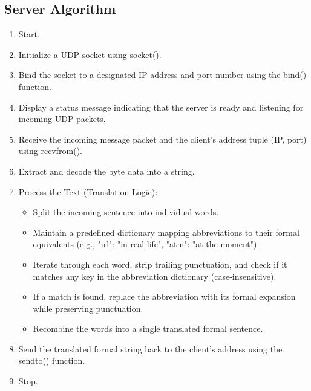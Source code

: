 \documentclass[12pt, a4paper]{report}
\begin{document}
\subsection*{Server Algorithm}
\begin{enumerate}
	\item Start.
	\item Initialize a UDP socket using socket().
	\item Bind the socket to a designated IP address and port number using the bind() function.
	\item Display a status message indicating that the server is ready and listening for incoming UDP packets.
	\item Receive the incoming message packet and the client's address tuple (IP, port) using recvfrom().
	\item Extract and decode the byte data into a string.
	\item Process the Text (Translation Logic):
	\begin{itemize}
		\item Split the incoming sentence into individual words.
		\item Maintain a predefined dictionary mapping abbreviations to their formal equivalents (e.g., "irl": "in real life", "atm": "at the moment").
		\item Iterate through each word, strip trailing punctuation, and check if it matches any key in the abbreviation dictionary (case-insensitive).
		\item If a match is found, replace the abbreviation with its formal expansion while preserving punctuation.
		\item Recombine the words into a single translated formal sentence.
	\end{itemize}
	\item Send the translated formal string back to the client's address using the sendto() function.
	\item Stop.
\end{enumerate}
\end{document}
